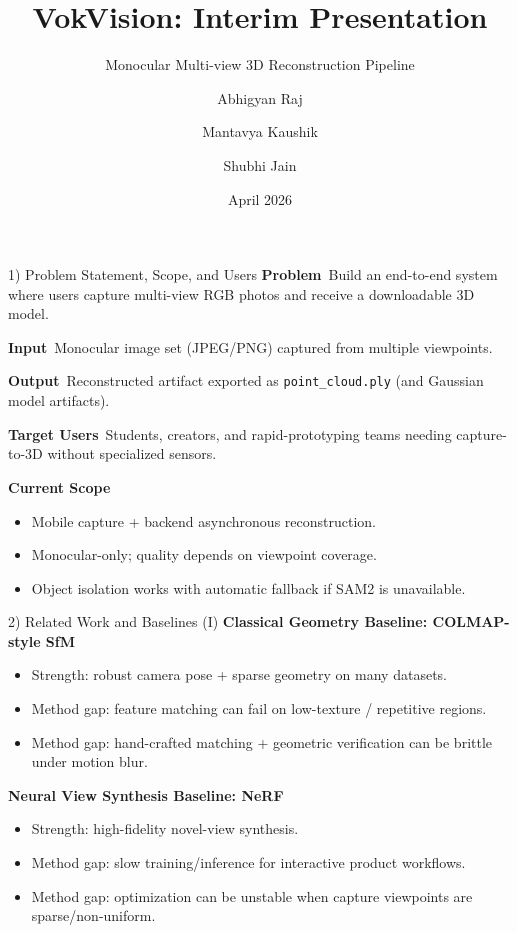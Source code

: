 \documentclass[aspectratio=169]{beamer}
\title[VokVision Interim]{VokVision: Interim Presentation}
\subtitle{Monocular Multi-view 3D Reconstruction Pipeline}
\author{Abhigyan Raj \and Mantavya Kaushik \and Shubhi Jain}
\institute{Engineering Track}
\date{April 2026}
\begin{document}
\begin{frame}
  \titlepage
\end{frame}

\begin{frame}{1) Problem Statement, Scope, and Users}
\textbf{Problem}\
Build an end-to-end system where users capture multi-view RGB photos and receive a downloadable 3D model.

\vspace{0.5em}
\textbf{Input}\
Monocular image set (JPEG/PNG) captured from multiple viewpoints.

\vspace{0.5em}
\textbf{Output}\
Reconstructed artifact exported as \texttt{point\_cloud.ply} (and Gaussian model artifacts).

\vspace{0.5em}
\textbf{Target Users}\
Students, creators, and rapid-prototyping teams needing capture-to-3D without specialized sensors.

\vspace{0.5em}
\textbf{Current Scope}\
\begin{itemize}
  \item Mobile capture + backend asynchronous reconstruction.
  \item Monocular-only; quality depends on viewpoint coverage.
  \item Object isolation works with automatic fallback if SAM2 is unavailable.
\end{itemize}
\end{frame}

\begin{frame}{2) Related Work and Baselines (I)}
\textbf{Classical Geometry Baseline: COLMAP-style SfM}
\begin{itemize}
  \item Strength: robust camera pose + sparse geometry on many datasets.
  \item Method gap: feature matching can fail on low-texture / repetitive regions.
  \item Method gap: hand-crafted matching + geometric verification can be brittle under motion blur.
\end{itemize}

\vspace{0.5em}
\textbf{Neural View Synthesis Baseline: NeRF}
\begin{itemize}
  \item Strength: high-fidelity novel-view synthesis.
  \item Method gap: slow training/inference for interactive product workflows.
  \item Method gap: optimization can be unstable when capture viewpoints are sparse/non-uniform.
\end{itemize}
\end{frame}
\end{document}
